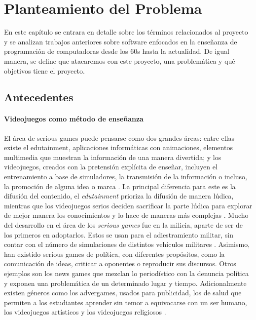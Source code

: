 \chapter{Planteamiento del Problema}
En este capítulo se entrara en detalle sobre los términos relacionados al proyecto y se analizan 
trabajos anteriores sobre software enfocados en la enseñanza de programación de computadoras desde los 
60s hasta la actualidad. De igual manera, se define que atacaremos con este proyecto, una problemática y qué objetivos tiene el proyecto.

\section{Antecedentes}

\subsubsection{Videojuegos como método de enseñanza}
El área de serious games puede pensarse como dos grandes áreas: entre ellas existe el edutainment, aplicaciones informáticas con animaciones, elementos multimedia que muestran la información de una manera divertida; y los videojuegos, creados con la pretensión explícita de enseñar, incluyen el entrenamiento a base de simuladores, 
la transmisión de la información o incluso, la promoción de alguna idea o marca \cite{unknown2017a}. 
La principal diferencia para este es la difusión del contenido, el \textit{edutainment} prioriza 
la difusión de manera lúdica, mientras que los videojuegos serios deciden 
sacrificar la parte lúdica para explorar de mejor manera los conocimientos y lo hace de maneras más complejas \cite{unknown2017a}.
Mucho del desarrollo en el área de los \textit{serious games} fue en la milicia, aparte de ser de los primeros en adoptarlos. Estos se usan para el adiestramiento militar, sin contar con el número de simulaciones de distintos vehículos militares \cite{unknown2017a}. 
Asimismo, han existido serious games de política, con diferentes propósitos, como la comunicación de ideas, criticar a oponentes o reproducir sus discursos. 
Otros ejemplos son los news games que mezclan lo periodístico con la denuncia política y exponen una problemática de un determinado lugar y tiempo. 
Adicionalmente existen géneros como los advergames, usados para publicidad, 
los de salud que permiten a los estudiantes aprender sin temor a equivocarse con un ser humano, los videojuegos artísticos y los videojuegos religiosos \cite{unknown2017a}.

